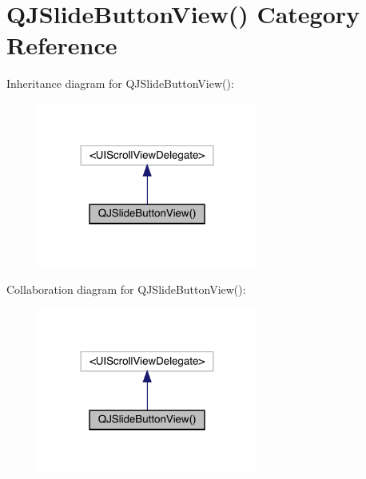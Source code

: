 \hypertarget{category_q_j_slide_button_view_07_08}{}\section{Q\+J\+Slide\+Button\+View() Category Reference}
\label{category_q_j_slide_button_view_07_08}


Inheritance diagram for Q\+J\+Slide\+Button\+View()\+:\nopagebreak
\begin{figure}[H]
\begin{center}
\leavevmode
\includegraphics[width=204pt]{category_q_j_slide_button_view_07_08__inherit__graph}
\end{center}
\end{figure}


Collaboration diagram for Q\+J\+Slide\+Button\+View()\+:\nopagebreak
\begin{figure}[H]
\begin{center}
\leavevmode
\includegraphics[width=204pt]{category_q_j_slide_button_view_07_08__coll__graph}
\end{center}
\end{figure}
